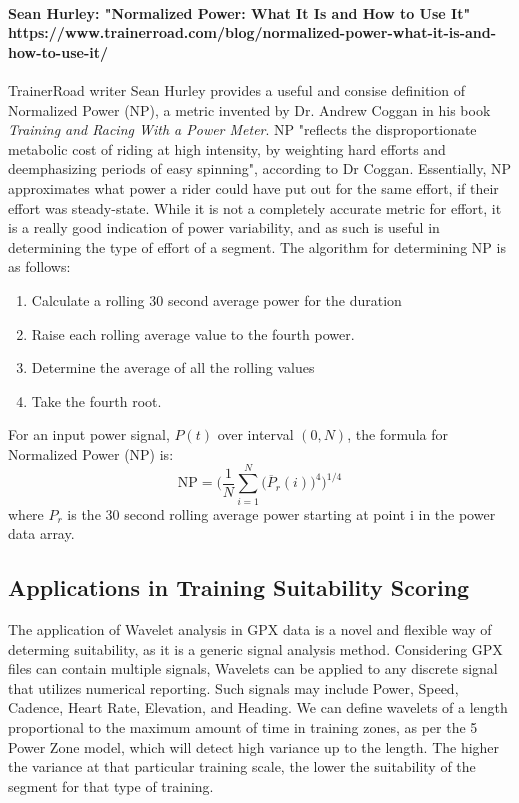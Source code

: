 \documentclass[12pt,a4paper]{report}
\begin{document}
\paragraph{Sean Hurley: "Normalized Power: What It Is and How to Use It" https://www.trainerroad.com/blog/normalized-power-what-it-is-and-how-to-use-it/}
TrainerRoad writer Sean Hurley provides a useful and consise definition of Normalized Power (NP), a metric invented by Dr. Andrew Coggan in his book \textit{Training and Racing With a Power Meter}. NP
"reflects the disproportionate metabolic cost of riding at high intensity, by weighting hard efforts and deemphasizing periods of easy spinning", according to Dr Coggan.
Essentially, NP approximates what power a rider could have put out for the same effort, if their effort was steady-state. While it is not a completely accurate metric for effort, it is a really
good indication of power variability, and as such is useful in determining the type of effort of a segment. The algorithm for determining NP is as follows:
\begin{enumerate}
	\item Calculate a rolling 30 second average power for the duration
	\item Raise each rolling average value to the fourth power.
	\item Determine the average of all the rolling values
	\item Take the fourth root.
\end{enumerate}
For an input power signal, $P(t)$ over interval $(0,N)$, the formula for Normalized Power (NP) is:
\[
	\mathrm{NP} = \bigg( \frac{1}{N} \sum_{i=1}^{N}\big(\overline{P}_{r}(i)\big)^{4}\bigg)^{1/4}
\]
where $P_r$ is the 30 second rolling average power starting at point i in the power data array.

\subsection{Applications in Training Suitability Scoring}

The application of Wavelet analysis in GPX data is a novel and flexible way of determing suitability, as it is a generic signal analysis method. Considering GPX files can
contain multiple signals, Wavelets can be applied to any discrete signal that utilizes numerical reporting. Such signals may include Power, Speed, Cadence, Heart Rate, Elevation, and Heading.
We can define wavelets of a length proportional to the maximum amount of time in training zones, as per the 5 Power Zone model, which will detect high variance up to the length. The higher the variance
at that particular training scale, the lower the suitability of the segment for that type of training.
\end{document}
